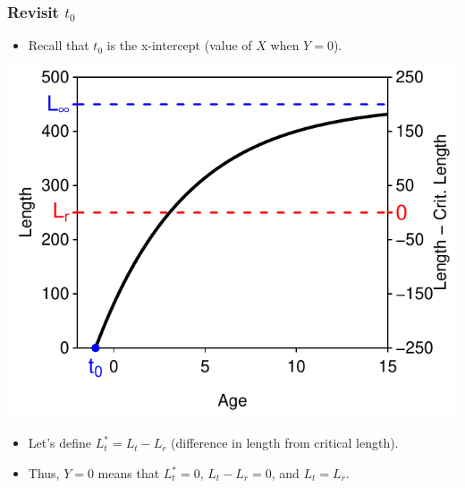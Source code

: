 \documentclass[xcolor=dvipsnames]{beamer}\usepackage[]{graphicx}\usepackage[]{color}
\newenvironment{knitrout}{}{} %
\begin{document}
\begin{frame}[fragile, t]
\frametitle{Revisit $t_{0}$}
  \vspace{-6pt}
  \begin{itemize}
    \item Recall that $t_{0}$ is the x-intercept (value of $X$ when $Y=0$).
  \end{itemize}
\begin{knitrout}\footnotesize
{}\color{fgcolor}

{\centering \includegraphics[width=.5\linewidth]{Figs/redefine4-1} 

}



\end{knitrout}
  \begin{itemize}
    \item Let's define $L^{*}_{t}=L_{t}-L_{r}$ (difference in length from critical length).
    \item Thus, $Y=0$ means that $L^{*}_{t}=0$, $L_{t}-L_{r}=0$, and $L_{t}=L_{r}$.
  \end{itemize}
\end{frame}
\end{document}
